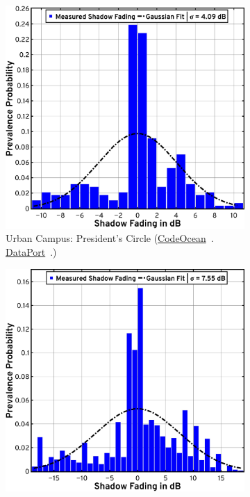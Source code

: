 \documentclass[10pt, twocolumn]{IEEEtran}
\begin{document}
{\begin{figure} [t]
    \centering
    \begin{subfigure}{0.4965\linewidth}
        \centering
        \includegraphics[width=0.95\linewidth]{figs/urban_campus_shadow_fading_1.pdf}
        \caption{Urban Campus: President's Circle (\href{https://codeocean.com/capsule/9545863/tree}{CodeOcean}~\cite{CodeOcean}. \href{http://ieee-dataport.org/12580}{DataPort}~\cite{DataPort}.)}
        \label{F9a}
    \end{subfigure}
    \begin{subfigure}{0.4935\linewidth}
        \centering
        \includegraphics[width=0.95\linewidth]{figs/urban_campus_shadow_fading_2.pdf}

\end{subfigure}
\end{figure}}
\end{document}

